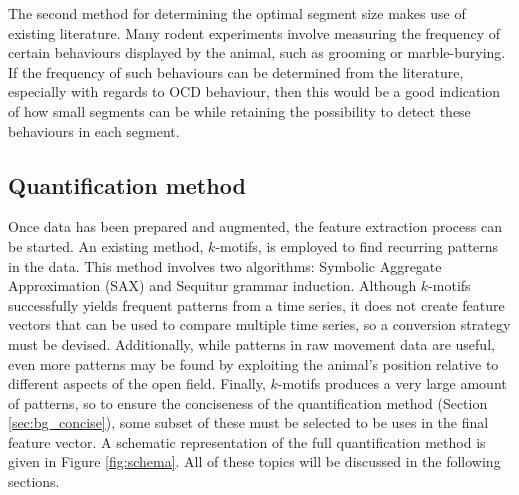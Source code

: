 \documentclass[conference,a4paper,twoside]{IEEEtran}
\begin{document}
The second method for determining the optimal segment size makes use of existing literature. Many rodent experiments involve measuring the frequency of certain behaviours displayed by the animal, such as grooming or marble-burying. If the frequency of such behaviours can be determined from the literature, especially with regards to OCD behaviour, then this would be a good indication of how small segments can be while retaining the possibility to detect these behaviours in each segment.

\subsection{Quantification method}
\label{sec:methods_features}

Once data has been prepared and augmented, the feature extraction process can be started. An existing method, $k$-motifs, is employed to find recurring patterns in the data. This method involves two algorithms: Symbolic Aggregate Approximation (SAX) and Sequitur grammar induction. Although $k$-motifs successfully yields frequent patterns from a time series, it does not create feature vectors that can be used to compare multiple time series, so a conversion strategy must be devised. Additionally, while patterns in raw movement data are useful, even more patterns may be found by exploiting the animal's position relative to different aspects of the open field. Finally, $k$-motifs produces a very large amount of patterns, so to ensure the conciseness of the quantification method (Section \ref{sec:bg_concise}), some subset of these must be selected to be uses in the final feature vector. A schematic representation of the full quantification method is given in Figure \ref{fig:schema}. All of these topics will be discussed in the following sections.
\end{document}
